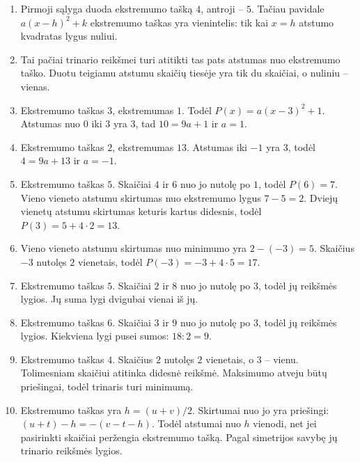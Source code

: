 \documentclass[11pt,a4paper]{scrartcl}
\begin{document}
\begin{enumerate}
\item Pirmoji sąlyga duoda ekstremumo tašką $4$, antroji -- $5$. Tačiau pavidale $a(x-h)^2+k$ ekstremumo taškas yra vienintelis: tik kai $x=h$ atstumo kvadratas lygus nuliui.
\item Tai pačiai trinario reikšmei turi atitikti tas pats atstumas nuo ekstremumo taško. Duotu teigiamu atstumu skaičių tiesėje yra tik du skaičiai, o nuliniu -- vienas.
\item Ekstremumo taškas $3$, ekstremumas $1$. Todėl $P(x)=a(x-3)^2+1$. Atstumas nuo $0$ iki $3$ yra $3$, tad $10=9a+1$ ir $a=1$.
\item Ekstremumo taškas $2$, ekstremumas $13$. Atstumas iki $-1$ yra $3$, todėl $4=9a+13$ ir $a=-1$.
\newpage
\item Ekstremumo taškas $5$. Skaičiai $4$ ir $6$ nuo jo nutolę po $1$, todėl $P(6)=7$. Vieno vieneto atstumu skirtumas nuo ekstremumo lygus $7-5=2$. Dviejų vienetų atstumu skirtumas keturis kartus didesnis, todėl $P(3)=5+4\cdot2=13$.
\item Vieno vieneto atstumu skirtumas nuo minimumo yra $2-(-3)=5$. Skaičius $-3$ nutolęs $2$ vienetais, todėl $P(-3)=-3+4\cdot5=17$.
\item Ekstremumo taškas $5$. Skaičiai $2$ ir $8$ nuo jo nutolę po $3$, todėl jų reikšmės lygios. Jų suma lygi dvigubai vienai iš jų.
\item Ekstremumo taškas $6$. Skaičiai $3$ ir $9$ nuo jo nutolę po $3$, todėl jų reikšmės lygios. Kiekviena lygi pusei sumos: $18:2=9$.
\item Ekstremumo taškas $4$. Skaičius $2$ nutolęs $2$ vienetais, o $3$ -- vienu. Tolimesniam skaičiui atitinka didesnė reikšmė. Maksimumo atveju būtų priešingai, todėl trinaris turi minimumą.
\item Ekstremumo taškas yra $h=(u+v)/2$. Skirtumai nuo jo yra priešingi: $(u+t)-h=-(v-t-h)$. Todėl atstumai nuo $h$ vienodi, net jei pasirinkti skaičiai peržengia ekstremumo tašką. Pagal simetrijos savybę jų trinario reikšmės lygios.
\end{enumerate}
\end{document}
